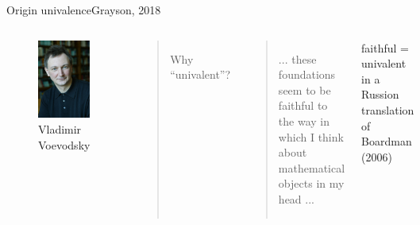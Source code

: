 \documentclass[english,draft]{beamer}
\begin{document}
\begin{frame}{Origin univalence}{Grayson, 2018}

\begin{columns}[c]
        \begin{center}
            \begin{figure}[h!]
                \includegraphics[height=.7\textheight]{figures/voevodsky.jpg}
                \caption{Vladimir Voevodsky}
            \end{figure} 
        \end{center}
        \begin{quotation}
            Why ``univalent''?
        \end{quotation}

        \pause

        \begin{quotation}
        ... these foundations seem to be faithful to the way in which I think about mathematical objects in my head ...
        \end{quotation}

        faithful = univalent in a Russion translation of Boardman (2006)

\end{columns}




\end{frame}
\end{document}
